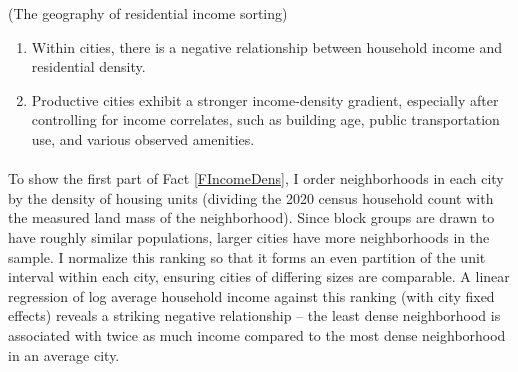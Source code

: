 \documentclass[12pt]{article}
\begin{document}
	\begin{Fact}\label{FIncomeDens}
		(The geography of residential income sorting)
		\begin{enumerate}
			\item Within cities, there is a negative relationship between household income and residential density. 
		
			\item Productive cities exhibit a stronger income-density gradient, especially after controlling for income correlates, such as building age, public transportation use, and various observed amenities.
		\end{enumerate}
	\end{Fact}

	\paragraph*{}
	To show the first part of Fact \ref{FIncomeDens}, I order neighborhoods in each city by the density of housing units (dividing the 2020 census household count with the measured land mass of the neighborhood). Since block groups are drawn to have roughly similar populations, larger cities have more neighborhoods in the sample. I normalize this ranking so that it forms an even partition of the unit interval within each city, ensuring cities of differing sizes are comparable. A linear regression of log average household income against this ranking (with city fixed effects) reveals a striking negative relationship -- the least dense neighborhood is associated with twice as much income compared to the most dense neighborhood in an average city. 
\end{document}
